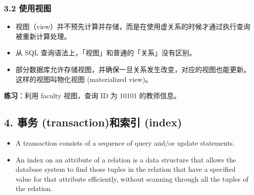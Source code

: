 \documentclass[aspectratio=169, 14pt]{beamer}
\begin{document}
\begin{frame}
	\frametitle{3.2 使用视图}
	\begin{itemize}
		\item<1-> 视图（view）并不预先计算并存储，而是在使用虚关系的时候才通过执行查询被重新计算处理。
		\item<1-> 从 SQL 查询语法上，「视图」和普通的「关系」没有区别。
		\item<2-> 部分数据库允许存储视图，并确保一旦关系发生改变，对应的视图也能更新。这样的视图叫\alert{物化视图} (materialized view)。
	\end{itemize}

	\pause
	{\large {}}  \textbf{练习}：利用 faculty 视图，查询 ID 为 10101 的教师信息。

\end{frame}

\begin{frame}
	\section{\textcolor{darkmidnightblue}{4. 事务 (transaction)和索引 (index)}}
	\begin{itemize}
		\item A \alert{transaction} consists of a sequence of query and/or update statements.
		\item An \alert{index} on an attribute of a relation is a data structure that allows the database system to find those tuples in the relation that have a specified value for that attribute efficiently, without scanning through all the tuples of the relation.
	\end{itemize}
\end{frame}
\end{document}
